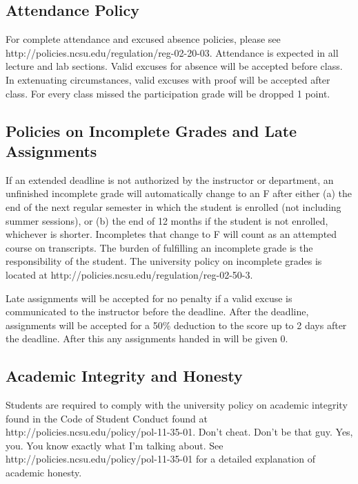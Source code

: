 \documentclass[11pt]{article}
\begin{document}
\subsection*{Attendance Policy}
\footnotesize{For complete attendance and excused absence policies, please see http://policies.ncsu.edu/regulation/reg-02-20-03. Attendance is expected in all lecture and lab sections. Valid excuses for absence will be accepted before class. In extenuating circumstances, valid excuses with proof will be accepted after class. For every class missed the participation grade will be dropped 1 point.}

\subsection*{Policies on Incomplete Grades and Late Assignments}
\footnotesize{If an extended deadline is not authorized by the instructor or department, an unfinished incomplete grade will automatically change to an F after either (a) the end of the next regular semester in which the student is enrolled (not including summer sessions), or (b) the end of 12 months if the student is not enrolled, whichever is shorter. Incompletes that change to F will count as an attempted course on transcripts. The burden of fulfilling an incomplete grade is the responsibility of the student. The university policy on incomplete grades is located at http://policies.ncsu.edu/regulation/reg-02-50-3.}

\footnotesize{Late assignments will be accepted for no penalty if a valid excuse is communicated to the instructor before the deadline. After the deadline, assignments will be accepted for a 50\% deduction to the score up to 2 days after the deadline. After this any assignments handed in will be given 0.}

\subsection*{Academic Integrity and Honesty}
\footnotesize{Students are required to comply with the university policy on academic integrity found in the Code of Student Conduct found at http://policies.ncsu.edu/policy/pol-11-35-01. Don't cheat. Don't be that guy. Yes, you. You know exactly what I'm talking about. See http://policies.ncsu.edu/policy/pol-11-35-01 for a detailed explanation of academic honesty.}
\end{document}
